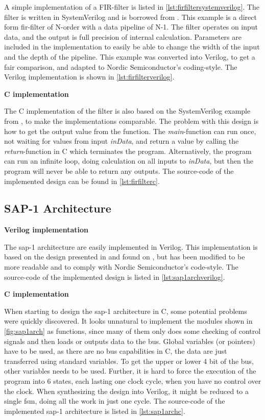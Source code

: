 A simple implementation of a FIR-filter is listed in \cref{lst:firfiltersystemverilog}. The filter is written in SystemVerilog and is borrowed from \cite{mehler2014digital}. This example is a direct form \gls{fir}-filter of N-order with a data pipeline of N-1. The filter operates on input data, and the output is full precision of internal calculation. Parameters are included in the implementation to easily be able to change the width of the input and the depth of the pipeline. This example was converted into Verilog, to get a fair comparison, and adapted to Nordic Semiconductor's coding-style. The Verilog implementation is shown in \cref{lst:firfilterverilog}.

\textbf{C implementation}

The C implementation of the filter is also based on the SystemVerilog example from \cite{mehler2014digital}, to make the implementations comparable. The problem with this design is how to get the output value from the function. The \textit{main}-function can run once, not waiting for values from input \textit{inData}, and return a value by calling the \textit{return}-function in C which terminates the program. Alternatively, the program can run an infinite loop, doing calculation on all inputs to \textit{inData}, but then the program will never be able to return any outputs. The source-code of the implemented design can be found in \cref{lst:firfilterc}.

\subsection{SAP-1 Architecture}
\textbf{Verilog implementation}

The \gls{sap-1} architecture are easily implemented in Verilog. This implementation is based on the design presented in \cite{dutta2007sap1} and found on \cite{sapblog}, but has been modified to be more readable and to comply with Nordic Semiconductor's code-style. The source-code of the implemented design is listed in \cref{lst:sap1archverilog}.

\textbf{C implementation}

When starting to design the \gls{sap-1} architecture in C, some potential problems were quickly discovered. It looks unnatural to implement the modules shown in \cref{fig:sap1arch} as functions, since many of them only does some checking of control signals and then loads or outputs data to the bus. Global variables (or pointers) have to be used, as there are no bus capabilities in C, the data are just transferred using standard variables. To get the upper or lower 4 bit of the bus, other variables needs to be used. Further, it is hard to force the execution of the program into 6 states, each lasting one clock cycle, when you have no control over the clock. When synthesizing the design into Verilog, it might be reduced to a single \gls{fsm}, doing all the work in just one cycle. The source-code of the implemented \gls{sap-1} architecture is listed in \cref{lst:sap1archc}.